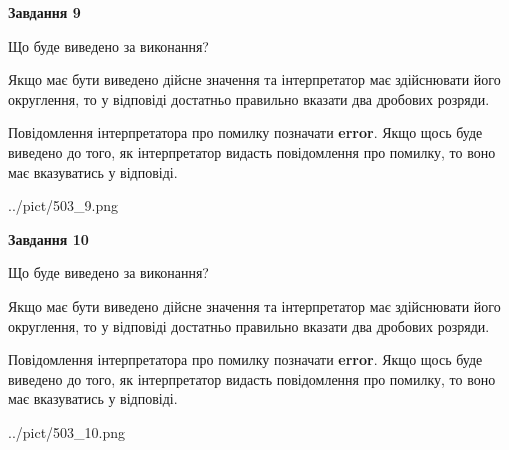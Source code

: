 \documentclass[12pt, ukrainian]{article}
\begin{document}
{\begin {Large}
{\begin {center}\textbf{Завдання 9}\end {center}}\par
Що буде виведено за виконання? \par

Якщо має бути виведено дійсне значення та інтерпретатор має здійснювати його округлення, 
то у відповіді достатньо правильно вказати два дробових розряди.

Повідомлення інтерпретатора про помилку позначати \textbf{error}.
Якщо щось буде виведено до того, як інтерпретатор видасть повідомлення про помилку, 
то воно має вказуватись у відповіді. \par

\begin{center}
	{../pict/503_9.png}
\end{center}
\newpage

{\begin {center}\textbf{Завдання 10}\end {center}}\par
Що буде виведено за виконання? \par

Якщо має бути виведено дійсне значення та інтерпретатор має здійснювати його округлення, 
то у відповіді достатньо правильно вказати два дробових розряди.

Повідомлення інтерпретатора про помилку позначати \textbf{error}.
Якщо щось буде виведено до того, як інтерпретатор видасть повідомлення про помилку, 
то воно має вказуватись у відповіді. \par

\begin{center}
	{../pict/503_10.png}
\end{center}
\newpage

\end {Large}}
\end{document}
